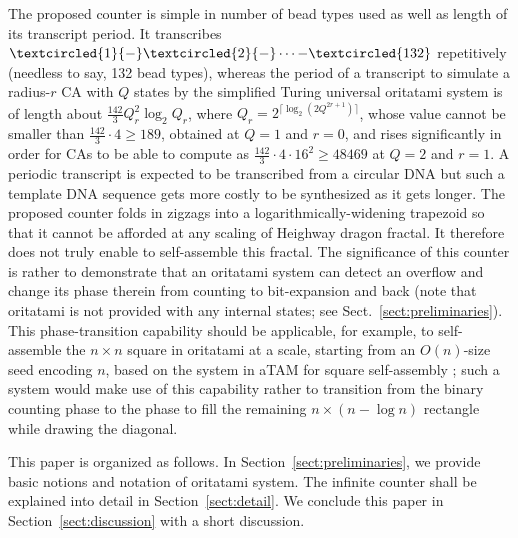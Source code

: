 \documentclass[twocolumn]{svjour3}
\begin{document}
The proposed counter is simple in number of bead types used as well as length of its transcript period. 
It transcribes $\textcircled{\scriptsize 1}{-}\textcircled{\scriptsize 2}{-} \cdots {-}\textcircled{\tiny 132}$ repetitively (needless to say, 132 bead types), whereas the period of a transcript to simulate a radius-$r$ CA with $Q$ states by the simplified Turing universal oritatami system \cite{PchelinaSSU2020} is of length about $\frac{142}{3}Q_r^2 \log_2 Q_r$, where $Q_r = 2^{\lceil \log_2(2Q^{2r+1})\rceil}$, whose value cannot be smaller than $\frac{142}{3} \cdot 4 \ge 189$, obtained at $Q = 1$ and $r = 0$, and rises significantly in order for CAs to be able to compute as $\frac{142}{3} \cdot 4 \cdot 16^2 \ge 48469$ at $Q=2$ and $r=1$. %
A periodic transcript is expected to be transcribed from a circular DNA \cite{GearyAndersen2014} but such a template DNA sequence gets more costly to be synthesized as it gets longer. 
The proposed counter folds in zigzags into a logarithmically-widening trapezoid so that it cannot be afforded at any scaling of Heighway dragon fractal. 
It therefore does not truly enable to self-assemble this fractal. 
The significance of this counter is rather to demonstrate that an oritatami system can detect an overflow and change its phase therein from counting to bit-expansion and back (note that oritatami is not provided with any internal states; see Sect.~\ref{sect:preliminaries}). 
This phase-transition capability should be applicable, for example, to self-assemble the $n \times n$ square in oritatami at a scale, starting from an $O(n)$-size seed encoding $n$, based on the system in aTAM for square self-assembly \cite{RothemundWinfree2000}; such a system would make use of this capability rather to transition from the binary counting phase to the phase to fill the remaining $n \times (n -\log n)$ rectangle while drawing the diagonal. 


This paper is organized as follows. 
In Section~\ref{sect:preliminaries}, we provide basic notions and notation of oritatami system. 
The infinite counter shall be explained into detail in Section~\ref{sect:detail}. 
We conclude this paper in Section~\ref{sect:discussion} with a short discussion. 
\end{document}
